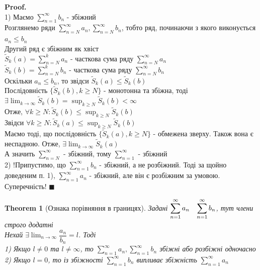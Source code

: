\documentclass[a4paper, 14pt]{extarticle}
\def\huge{\displaystyle}
\def\bigline{\vspace{5mm}\\}
\theoremstyle{theoremdd}
\newtheorem{theorem}{Theorem}[subsection]
\theoremstyle{theoremdd}
\theoremstyle{theoremdd}
\theoremstyle{theoremdd}
\theoremstyle{theoremdd}
\theoremstyle{theoremdd}
\theoremstyle{theoremdd}
\theoremstyle{theoremdd}
\newenvironment{pf}{\vspace*{-3mm} \textbf{Proof. \\}}{$\blacksquare$}
\begin{document}
\begin{pf}
1) Маємо $\huge\sum_{n=1}^\infty b_n$ - збіжний\\
Розглянемо ряди $\huge\sum_{n=N}^\infty a_n, \huge\sum_{n=N}^\infty b_n$, тобто ряд, починаючи з якого виконується $a_n \leq b_n$\\
Другий ряд є збіжним як хвіст\\
$\tilde{S}_k(a) = \huge\sum_{n=N}^k a_n$ - часткова сума ряду $\huge\sum_{n=N}^\infty a_n$\\
$\tilde{S}_k(b) = \huge\sum_{n=N}^k b_n$ - часткова сума ряду $\huge\sum_{n=N}^\infty b_n$\\
Оскільки $a_n \leq b_n$, то звідси $\tilde{S}_k(a) \leq \tilde{S}_k(b)$\\
Послідовність $\{\tilde{S}_k(b), k \geq N\}$ - монотонна та збіжна, тоді \\ $\exists \huge\lim_{k \to \infty} \tilde{S}_k(b) = \huge\sup_{k \geq N} \tilde{S}_k(b) < \infty$\\
Отже, $\forall k \geq N: \tilde{S}_k(b) \leq \huge\sup_{k \geq N} \tilde{S}_k(b)$\\
Звідси $\forall k \geq N: \tilde{S}_k(a) \leq \huge\sup_{k \geq N} \tilde{S}_k(b)$\\
Маємо тоді, що послідовність $\{\tilde{S}_k(a), k \geq N\}$ - обмежена зверху. Також вона є неспадною. Отже, $\exists \huge\lim_{k \to \infty} \tilde{S}_k(a)$\\
А значить $\huge\sum_{n=N}^\infty$ - збіжний, тому $\huge\sum_{n=1}^\infty$ - збіжний
\bigline
2) !Припустимо, що $\huge\sum_{n=1}^\infty b_n$ - збіжний, а не розбіжний. Тоді за щойно доведеним п. 1), $\huge\sum_{n=1}^\infty a_n$ - збіжний, але він є розбіжним за умовою. Суперечність!
\end{pf}

\begin{theorem}[Ознака порівняння в границях]
Задані $\huge \sum_{n=1}^{\infty} a_n \hspace{0.3cm} \sum_{n=1}^{\infty} b_n$, тут члени строго додатні\\
Нехай $\exists \huge \lim_{n \to \infty} \dfrac{a_n}{b_n} = l$. Тоді\\
1) Якщо $l \neq 0$ та $l \neq \infty$, то $\huge \sum_{n=1}^{\infty} a_n, \sum_{n=1}^{\infty} b_n$ збіжні або розбіжні одночасно\\
2) Якщо $l = 0$, то із збіжності $\huge \sum_{n=1}^{\infty} b_n$ випливає збіжність $\huge \sum_{n=1}^{\infty} a_n$
\end{theorem}
\end{document}
